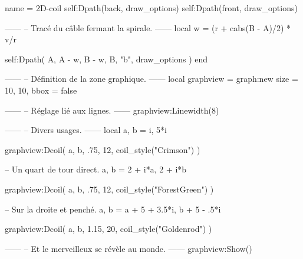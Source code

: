 \documentclass[varwidth]{standalone}
\begin{document}
\begin{luadraw}{name = 2D-coil}
  self:Dpath(back, draw_options)
  self:Dpath(front, draw_options)

------
-- Tracé du câble fermant la spirale.
------
  local w = (r + cabs(B - A)/2) * v/r

  self:Dpath(
    {A, A - w, B - w, B, "b"},
    draw_options
  )
end

------
-- Définition de la zone graphique.
------
local graphview = graph:new{
  size = {10, 10},
  bbox = false
}

------
-- Réglage lié aux lignes.
------
graphview:Linewidth(8)

------
-- Divers usages.
------
local a, b = i, 5*i

graphview:Dcoil(
  a, b,
  .75,
  12,
  coil_style("Crimson")
)

-- Un quart de tour direct.
a, b = 2 + i*a, 2 + i*b

graphview:Dcoil(
  a, b,
  .75,
  12,
  coil_style("ForestGreen")
)

-- Sur la droite et penché.
a, b = a + 5 + 3.5*i, b + 5 - .5*i

graphview:Dcoil(
  a, b,
  1.15,
  20,
  coil_style("Goldenrod")
)

------
-- Et le merveilleux se révèle au monde.
------
graphview:Show()
\end{luadraw}
\end{document}
